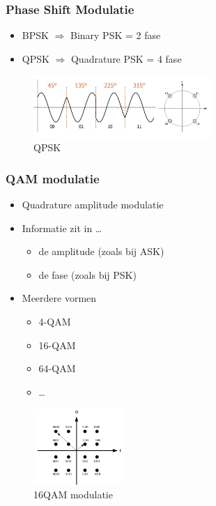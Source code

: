 \documentclass{article}
\begin{document}
\subsubsection{Phase Shift Modulatie}
\begin{itemize}
    \item BPSK $\Rightarrow$ Binary PSK = 2 fase
    \item QPSK $\Rightarrow$ Quadrature PSK = 4 fase
\end{itemize}

\begin{figure}[H]
    \centering
    \includegraphics[width=0.6\textwidth]{Screenshot_20200302_122452.png}
    \caption{QPSK}
\end{figure}

\subsubsection{QAM modulatie}
\begin{itemize}
    \item Quadrature amplitude modulatie
    \item Informatie zit in \dots
    \begin{itemize}
        \item de amplitude (zoals bij ASK)
        \item de fase (zoals bij PSK)
    \end{itemize}
    \item Meerdere vormen
    \begin{itemize}
        \item 4-QAM
        \item 16-QAM
        \item 64-QAM
        \item \dots
    \end{itemize}
\end{itemize}

\begin{figure}[H]
    \centering
    \includegraphics[width=0.3\textwidth]{Screenshot_20200315_160021.png}
    \caption{16QAM modulatie}
\end{figure}
\end{document}

